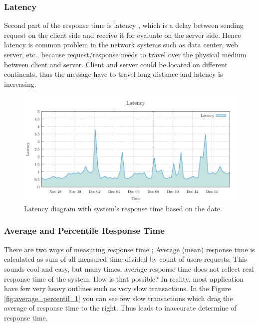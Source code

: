 \subsubsection*{Latency}
Second part of the response time is latency \cite{Broadwell:RPT, BHATT:PERF}, which is a delay between sending request on the client side and receive it for evaluate on the server side. Hence latency is common problem in the network systems such as data center, web server, etc., because request/response needs to travel over the physical medium between client and server. Client and server could be located on different continents, thus the message have to travel long distance and latency is increasing.  

\begin{figure}[H]
  \centering
  \includegraphics[width=15cm]{obrazky-figures/latency.pdf}
  \caption{Latency diagram with system's response time based on the date.}
  \label{fig:latency}
\end{figure}

\subsubsection*{Average and Percentile Response Time}
There are two ways of measuring response time \cite{Kopp:RPT}; Average (mean) response time is calculated as sum of all measured time divided by count of users requests. This sounds cool and easy, but many times, average response time does not reflect real response time of the system. How is that possible? In reality, most application have few very heavy outlines such as very slow transactions. In the Figure \ref{fig:average_percentil_1} you can see few slow transactions which drag the average of response time to the right. Thus leads to inaccurate determine of response time.


